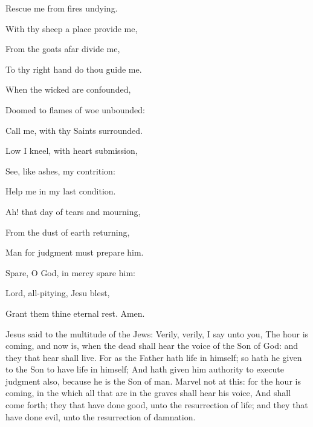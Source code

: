 \begin{multicols}{2}
\begin{hangparas}{1.25em}{1}
Rescue me from fires undying.\\
\par\noindent
With thy sheep a place provide me,\par\noindent
From the goats afar divide me,\par\noindent
To thy right hand do thou guide me.\\
\par\noindent
When the wicked are confounded,\par\noindent
Doomed to flames of woe unbounded:\par\noindent
Call me, with thy Saints surrounded.\\
\par\noindent
Low I kneel, with heart submission,\par\noindent
See, like ashes, my contrition:\par\noindent
Help me in my last condition.\\
\par\noindent
Ah! that day of tears and mourning,\par\noindent
From the dust of earth returning,\par\noindent
Man for judgment must prepare him.\\
\par\noindent
Spare, O God, in mercy spare him:\par\noindent
Lord, all-pitying, Jesu blest,\par\noindent
Grant them thine eternal rest. Amen.
\end{hangparas}
\end{multicols}

 Jesus said to the multitude of the Jews: Verily, verily, I say unto you, The hour is coming, and now is, when the dead shall hear the voice of the Son of God: and they that hear shall live. For as the Father hath life in himself; so hath he given to the Son to have life in himself; And hath given him authority to execute judgment also, because he is the Son of man. Marvel not at this: for the hour is coming, in the which all that are in the graves shall hear his voice, And shall come forth; they that have done good, unto the resurrection of life; and they that have done evil, unto the resurrection of damnation.


